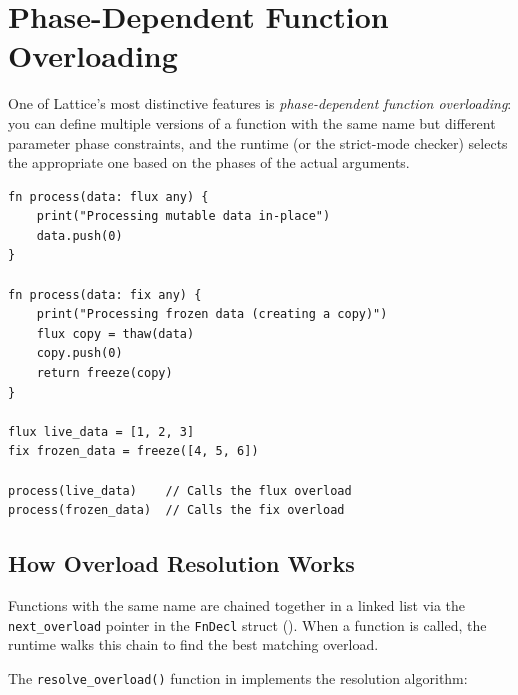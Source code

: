 
\section{Phase-Dependent Function Overloading}\label{sec:phase-overloading}


One of Lattice's most distinctive features is \emph{phase-dependent function overloading}: you can define multiple versions of a function with the same name but different parameter phase constraints, and the runtime (or the strict-mode checker) selects the appropriate one based on the phases of the actual arguments.

\begin{lstlisting}[language=Lattice, caption={Phase-dependent overloading}]
fn process(data: flux any) {
    print("Processing mutable data in-place")
    data.push(0)
}

fn process(data: fix any) {
    print("Processing frozen data (creating a copy)")
    flux copy = thaw(data)
    copy.push(0)
    return freeze(copy)
}

flux live_data = [1, 2, 3]
fix frozen_data = freeze([4, 5, 6])

process(live_data)    // Calls the flux overload
process(frozen_data)  // Calls the fix overload
\end{lstlisting}

\subsection{How Overload Resolution Works}

Functions with the same name are chained together in a linked list via the \lstinline|next_overload| pointer in the \lstinline|FnDecl| struct ().
When a function is called, the runtime walks this chain to find the best matching overload.

The \lstinline|resolve_overload()| function in  implements the resolution algorithm:

